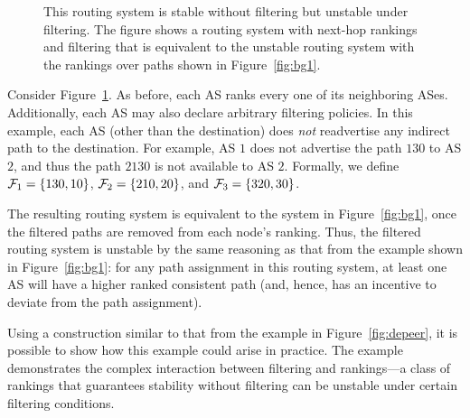 \begin{figure}
\centering
{}
\caption[Routing system that is stable without filtering but unstable
  under filtering.]{This routing system is stable without filtering but
  unstable 
  under filtering. The figure shows a routing system with
  next-hop rankings and filtering that is equivalent to the unstable
  routing system with the rankings over paths shown in
  Figure~\ref{fig:bg1}.}
\label{fig:bg2}
\end{figure}



\begin{example}
Consider Figure~\ref{fig:bg2}.  As before, each AS ranks every one of its neighboring ASes.  Additionally,
each AS may also declare arbitrary filtering policies.  In this
example, each AS (other than the destination) does {\em not}
readvertise any indirect path to the destination.  For example, AS $1$
does not advertise the path $1 3 0$ to AS $2$, and thus the path
$2130$ is not available to AS $2$.  Formally, we define $\mathcal{F}_1 =
\{130, 10\}$, $\mathcal{F}_2 = \{210, 20\}$, and $\mathcal{F}_3 = \{320, 30\}$.

The resulting routing system is
equivalent to the system in Figure~\ref{fig:bg1}, once the filtered
paths are removed from each node's ranking.  Thus, the
filtered routing 
system is unstable by the same reasoning as that from the example shown
in Figure~\ref{fig:bg1}:
for any path assignment in this routing system, at 
least one AS will have a higher ranked consistent path (and, hence,
has an incentive to deviate from the path assignment).  
\end{example}

Using a construction similar to that from the example in
Figure~\ref{fig:depeer}, it is 
possible to show how this example could arise in practice.  The
example demonstrates the complex interaction between filtering and
rankings---a class of rankings that guarantees stability
without filtering can be unstable under certain
filtering conditions.   


